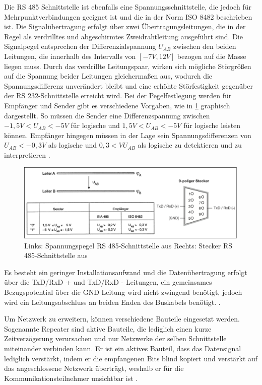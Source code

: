 Die RS 485 Schnittstelle ist ebenfalls eine Spannungsschnittstelle, die jedoch für Mehrpunktverbindungen geeignet ist und die in der Norm ISO
8482 beschrieben ist. Die Signalübertragung erfolgt über zwei Übertragungsleitungen, die in der Regel als verdrilltes und abgeschirmtes Zweidrahtleitung ausgeführt sind. Die Signalpegel entsprechen der Differenzialspannung $U_{AB}$ zwischen den beiden Leitungen, die innerhalb des Intervalls von $[-7V,12V]$ bezogen auf die Masse liegen muss. Durch das verdrillte Leitungspaar, wirken sich mögliche Störgrößen auf die Spannung beider Leitungen gleichermaßen aus, wodurch die Spannungsdifferenz unverändert bleibt und eine erhöhte Störfestigkeit gegenüber der RS 232-Schnittstelle erreicht wird.
Bei der Pegelfestlegung werden für Empfänger und Sender gibt es verschiedene Vorgaben, wie in \ref{fig:rs485} graphisch dargestellt. So müssen die Sender eine Differenzspannung zwischen $-1,5V<U_{AB}<-5V$ für logische \Gob und $1,5V<U_{AB}<-5V$ für logische \Gob leisten können. Empfänger hingegen müssen in der Lage sein Spannungsdifferenzen von $U_{AB}<-0,3V$ als logische \Gob und $0,3<VU_{AB}$ als logische \Gob zu detektieren und zu interpretieren \cite[S.~59ff.]{schn06}.

\begin{figure}
\centering
\includegraphics[width=\textwidth]{abbildungen/20160314_rs485}
\caption[Spannungspegel und Stecker der RS 485-Schnittstelle]{Links: Spannungspegel RS 485-Schnittstelle aus \cite[S.~60]{schn06} \newline Rechts: Stecker RS 485-Schnittstelle aus \cite[S.~19]{sch08}}
\label{fig:rs485}
\end{figure}

Es besteht ein geringer Installationsaufwand und die Datenübertragung erfolgt über die TxD/RxD + und TxD/RxD - Leitungen, ein gemeinsames Bezugspotential über die GND Leitung wird nicht zwingend benötigt, jedoch wird ein Leitungsabschluss an beiden Enden des Buskabels benötigt.  \cite[S.~19f.]{sch08}.


Um Netzwerk zu erweitern, können verschiedene Bauteile eingesetzt werden. Sogenannte Repeater sind aktive Bauteile, die lediglich einen kurze Zeitverzögerung verursachen und nur Netzwerke der selben Schnittstelle miteinander verbinden kann. Er ist ein aktives Bauteil, dass das Datensignal lediglich verstärkt, indem er die empfangenen Bits blind kopiert und verstärkt auf das angeschlossene Netzwerk überträgt, weshalb er für die Kommunikationsteilnehmer unsichtbar ist \cite[S.~79f.]{schn06}.

